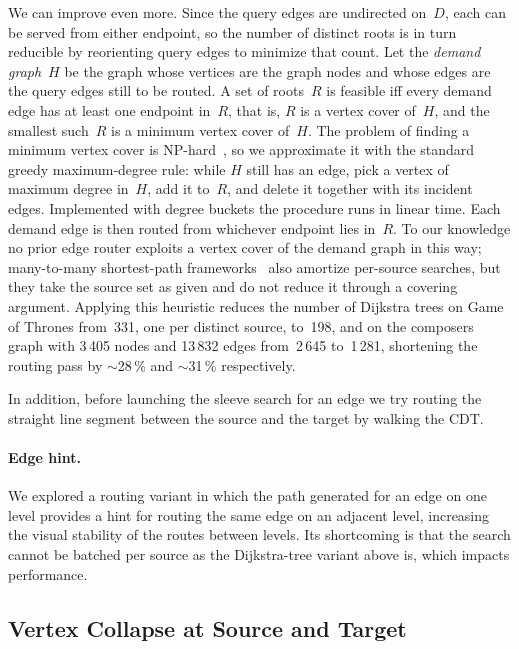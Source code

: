 \documentclass[a4paper,USenglish,anonymous]{gd-lipics-v3}
\begin{document}
We can improve even more. Since the query edges are undirected
on~$D$, each can be served from either endpoint, so the number of
distinct roots is in turn reducible by reorienting query edges to
minimize that count. Let the \emph{demand graph}~$H$ be the graph
whose vertices are the graph nodes and whose edges are the query
edges still to be routed. A set of roots~$R$ is feasible iff every
demand edge has at least one endpoint in~$R$, that is, $R$ is a
vertex cover of~$H$, and the smallest such~$R$ is a minimum vertex
cover of~$H$. The problem of finding a minimum vertex cover is
NP-hard~\cite{karp1972reducibility}, so we approximate it
with the standard greedy maximum-degree rule: while $H$ still has an
edge, pick a vertex of maximum degree in~$H$, add it to~$R$, and
delete it together with its incident edges. Implemented with degree
buckets the procedure runs in linear time. Each demand edge is then
routed from whichever endpoint lies in~$R$. To our knowledge no
prior edge router exploits a vertex cover of the demand graph in
this way; many-to-many shortest-path
frameworks~\cite{knopp2007many} also amortize per-source searches,
but they take the source set as given and do not reduce it through a
covering argument. Applying this heuristic reduces the number of
Dijkstra trees on Game of Thrones from~331, one per distinct source,
to~198, and on the composers graph with 3\,405 nodes and 13\,832
edges from~2\,645 to~1\,281, shortening the routing pass by
$\sim$28\,\% and $\sim$31\,\% respectively.

In addition, before launching the sleeve search for an edge we try routing the
straight line segment between the source and the target by walking the
CDT.

\paragraph{Edge hint.}
We explored a routing variant in which the path generated for an edge
on one level provides a hint for routing the same edge on an adjacent
level, increasing the visual stability of the routes between
levels. Its shortcoming is that the search cannot be batched per
source as the Dijkstra-tree variant above is, which impacts
performance.

\subsection{Vertex Collapse at Source and Target}
\label{sec:collapse}
\end{document}

